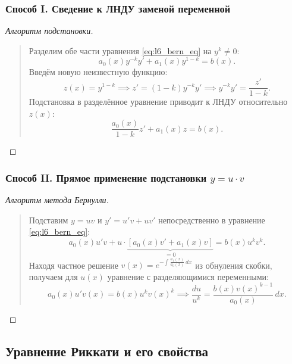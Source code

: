 \subsubsection{Способ I. Сведение к ЛНДУ заменой переменной}

\begin{proof}[Алгоритм подстановки]~\\
    \begin{quote}
        Разделим обе части уравнения \eqref{eq:l6_bern_eq} на $y^k \neq 0$:
        \[
            a_0(x) y^{-k} y' + a_1(x) y^{1-k} = b(x).
        \]
        Введём новую неизвестную функцию:
        \begin{equation} \label{eq:l6_bern_z}
            z(x) = y^{1-k} \implies z' = (1 - k) y^{-k} y' \implies
            y^{-k} y' = \frac{z'}{1 - k}. \tag{10}
        \end{equation}
        Подстановка в разделённое уравнение приводит к ЛНДУ относительно $z(x)$:
        \begin{equation} \label{eq:l6_bern_lin}
            \frac{a_0(x)}{1 - k} z' + a_1(x) z = b(x). \tag{11}
        \end{equation}
    \end{quote}
\end{proof}

\subsubsection{Способ II. Прямое применение подстановки $y = u \cdot v$}

\begin{proof}[Алгоритм метода Бернулли]~\\
    \begin{quote}
        Подставим $y = u v$ и $y' = u' v + u v'$ непосредственно в уравнение
        \eqref{eq:l6_bern_eq}:
        \[
            a_0(x) u' v + u \cdot \underbrace{\left[a_0(x) v' +
            a_1(x) v\right]}_{= 0} = b(x) u^k v^k.
        \]
        Находя частное решение $v(x) = e^{-\int \frac{a_1(x)}{a_0(x)} \, dx}$
        из обнуления скобки, получаем для $u(x)$ уравнение с разделяющимися
        переменными:
        \[
            a_0(x) u' v(x) = b(x) u^k v(x)^k \implies
            \frac{du}{u^k} = \frac{b(x) v(x)^{k-1}}{a_0(x)} \, dx.
        \]
    \end{quote}
\end{proof}

\subsection{Уравнение Риккати и его свойства}

